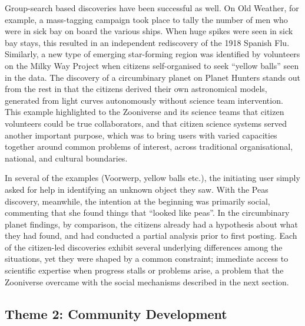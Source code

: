 \documentclass{sigchi}
\begin{document}
\begin{spacing}{0.97}
Group-search based discoveries have been successful as well. On Old Weather, for example, a mass-tagging campaign took place to tally the number of men who were in sick bay on board the various ships. When huge spikes were seen in sick bay stays, this resulted in an independent rediscovery of the 1918 Spanish Flu. Similarly, a new type of emerging star-forming region was identified by volunteers on the Milky Way Project when citizens self-organised to seek ``yellow balls'' seen in the data. The discovery of a circumbinary planet on Planet Hunters \cite{schwamb2013planet} stands out from the rest in that the citizens derived their own astronomical models, generated from light curves autonomously without science team intervention. This example highlighted to the Zooniverse and its science teams that citizen volunteers could be true collaborators, and that citizen science systems served another important purpose, which was to bring users with varied capacities together around common problems of interest, across traditional organisational, national, and cultural boundaries.

In several of the examples (Voorwerp, yellow balls etc.), the initiating user simply asked for help in identifying an unknown object they saw. With the Peas discovery, meanwhile, the intention at the beginning was primarily social, commenting that she found things that ``looked like peas''. In the circumbinary planet findings, by comparison, the citizens already had a hypothesis about what they had found, and had conducted a partial analysis prior to first posting. Each of the citizen-led discoveries exhibit several underlying differences among the situations, yet they were shaped by a common constraint; immediate access to scientific expertise when progress stalls or problems arise, a problem that the Zooniverse overcame with the social mechanisms described in the next section.

\subsection{Theme 2: Community Development}


\end{spacing}
\end{document}
